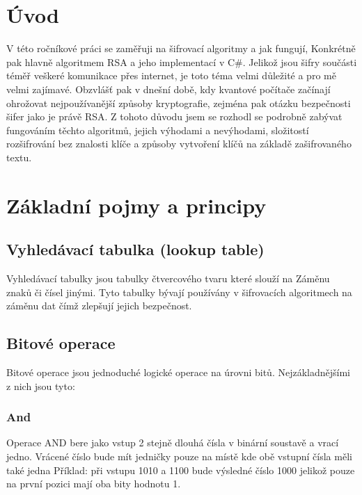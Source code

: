 \documentclass[12pt,a4paper]{report}
\begin{document}


\tableofcontents

\chapter{Úvod}
V této ročníkové práci se zaměřuji na šifrovací algoritmy a jak fungují, Konkrétně pak hlavně algoritmem RSA a jeho implementací v C\#. Jelikož jsou šifry součásti téměř veškeré komunikace přes internet, je toto téma velmi důležité a pro mě velmi zajímavé. Obzvlášť pak v dnešní době, kdy kvantové počítače začínají ohrožovat nejpoužívanější způsoby kryptografie, zejména pak otázku bezpečnosti šifer jako je právě RSA. Z tohoto důvodu jsem se rozhodl se podrobně zabývat fungováním těchto algoritmů, jejich výhodami a nevýhodami, složitostí rozšifrování bez znalosti klíče a způsoby vytvoření klíčů na základě zašifrovaného textu.


\chapter{Základní pojmy a principy} %

\section{Vyhledávací tabulka (lookup table)}
Vyhledávací tabulky jsou tabulky čtvercového tvaru které slouží na Záměnu znaků či čísel jinými. Tyto tabulky bývají používány v šifrovacích algoritmech na záměnu dat čímž zlepšují jejich bezpečnost.

\section{Bitové operace}
Bitové operace jsou jednoduché logické operace na úrovni bitů. Nejzákladnějšími z nich jsou tyto:

\subsection{And}
Operace AND bere jako vstup 2 stejně dlouhá čísla v binární soustavě a vrací jedno. Vrácené číslo bude mít jedničky pouze na místě kde obě vstupní čísla měli také jedna Příklad: při vstupu 1010 a 1100 bude výsledné číslo 1000 jelikož pouze na první pozici mají oba bity hodnotu 1.
\end{document}
